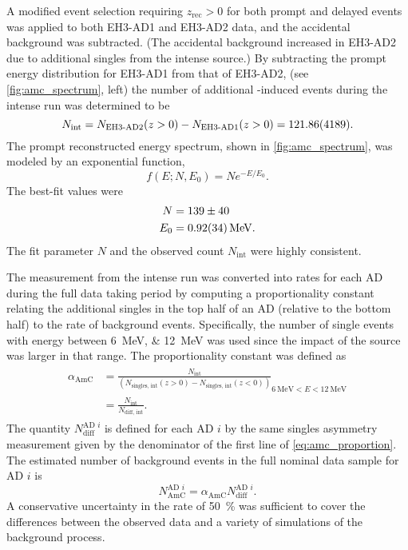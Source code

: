 A modified event selection requiring $z_\text{rec} > 0$
for both prompt and delayed events
was applied to both EH3-AD1 and EH3-AD2 data,
and the accidental background was subtracted.
(The accidental background increased in EH3-AD2 due to additional singles
from the intense \amc{} source.)
By subtracting the prompt energy distribution for EH3-AD1 from that of EH3-AD2,
(see \cref{fig:amc_spectrum}, left)
the number of additional \amc{}-induced events during the intense run
was determined to be
\begin{equation}\label{eq:amc_intense}
    N_\text{int} = N_\text{EH3-AD2}(z > 0) - N_\text{EH3-AD1}(z > 0)
    = \num{121.86\pm41.89}.
\end{equation}
The prompt reconstructed energy spectrum, shown in \cref{fig:amc_spectrum},
was modeled by an exponential function,
\begin{equation}\label{eq:amc_spec_fit}
    f(E; N, E_0) = N e^{-E/E_0}.
\end{equation}
The best-fit values were
\begin{align}\label{eq:amc_spec_params}
    \begin{split}
        N &= 139\pm40 \\
        E_0 &= \SI{0.92\pm0.34}{\MeV}.
    \end{split}
\end{align}
The fit parameter $N$ and the observed count $N_\text{int}$
were highly consistent.

The measurement from the intense run was converted
into rates for each AD during the full data taking period
by computing a proportionality constant
relating the additional singles in the top half of an AD
(relative to the bottom half)
to the rate of \amc{} background events.
Specifically, the number of single events
with energy between \SIlist{6;12}{\MeV} was used
since the impact of the \amc{} source was larger in that range.
The proportionality constant was defined as
\begin{align}\label{eq:amc_proportion}
    \begin{split}
        \alpha_\text{AmC} &= \frac{N_\text{int}}{
            (N_\text{singles, int}(z>0) - N_\text{singles, int}(z < 0))
        }_
        {
            \SI{6}{\MeV} < E < \SI{12}{\MeV}
        } \\
        &= \frac{N_\text{int}}{N_\text{diff, int}}.
    \end{split}
\end{align}
The quantity $N_\text{diff}^{\text{AD }i}$ is defined for each AD $i$
by the same singles asymmetry measurement
given by the denominator of the first line of \cref{eq:amc_proportion}.
The estimated number of \amc{} background events
in the full nominal data sample for AD $i$ is
\begin{equation}\label{eq:amc_count}
    N_\text{AmC}^{\text{AD }i} = \alpha_\text{AmC} N_\text{diff}^{\text{AD }i}.
\end{equation}
A conservative uncertainty in the rate of \SI{50}{\percent}
was sufficient to cover the differences between the observed data
and a variety of simulations of the \amc{} background process.

